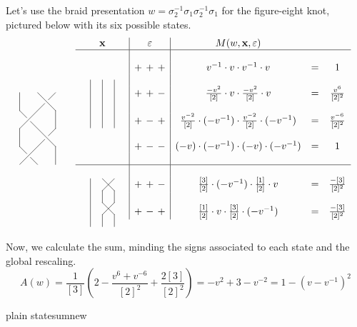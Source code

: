 \documentclass [12pt, letterpaper, oneside] {amsart}
\newcommand \e {\varepsilon}
\newcommand \s {\sigma}
\newcommand \mb {\mathbf}
\theoremstyle {plain}
\begin{document}
Let's use the braid presentation $w = \s_2^{-1} \s_1 \s_2^{-1} \s_1$ for the figure-eight knot, pictured below with its six possible states.
\[
\vcenter{\xy 0;/r.15pc/:
(0,0);(14,14)**@{-},
(16,16);(20,20)**@{-},
(20,20);(20,30)**@{-},
(20,30);(10,40)**@{-},
(10,0);(6,4)**@{-},
(4,6);(0,10)**@{-},
(0,10);(0,20)**@{-},
(0,20);(14,34)**@{-},
(16,36);(20,40)**@{-},
(20,0);(20,10)**@{-},
(20,10);(6,24)**@{-},
(4,26);(0,30)**@{-},
(0,30);(0,40)**@{-}
\endxy} \qquad
\begin {array} {c | c | c c c}
\mb{x} & \e & M(w, \mb{x}, \e) & & \\
\hline
& & & & \\
\multirow {7} {*}
{\quad $\vcenter{\xy 0;/r.10pc/:
(0,0);(0,40)**@{-},
(10,0);(10,40)**@{-},
(20,0);(20,40)**@{-}
\endxy}$} \quad
& + \, + \, + & v^{-1} \cdot v \cdot v^{-1} \cdot v &=& 1 \\
&&&& \\
&+ \, + \, - & \frac {-v^2} {[2]} \cdot v \cdot \frac {-v^2} {[2]} \cdot v &=& \frac {v^6} {[2]^2} \\
&&&& \\
&+ \, - \, + & \frac {v^{-2}} {[2]} \cdot (-v^{-1}) \cdot \frac {v^{-2}} {[2]} \cdot (-v^{-1}) &=& \frac {v^{-6}} {[2]^2} \\
&&&& \\
&+ \, - \, - & (-v) \cdot (-v^{-1}) \cdot (-v) \cdot (-v^{-1}) &=& 1 \\
&&&& \\
\hline
& & & & \\
\multirow {3} {*}
{\quad $\vcenter{\xy 0;/r.10pc/:
(0,0);(0,40)**@{-},
(10,0);(10,10)**@{-},
(10,10);(20,20)**@{-},
(20,20);(20,30)**@{-},
(20,30);(10,40)**@{-},
(20,0);(20,10)**@{-},
(20,10);(10,20)**@{-},
(10,20);(10,30)**@{-},
(10,30);(20,40)**@{-}
\endxy}$} \quad
&+ \, + \, - & \frac {[3]} {[2]} \cdot (-v^{-1}) \cdot \frac {[1]} {[2]} \cdot v &=& \frac {-[3]} {[2]^2} \\
&&&& \\
&+ \, - \, + & \frac {[1]} {[2]} \cdot v \cdot \frac {[3]} {[2]} \cdot (-v^{-1}) &=& \frac {-[3]} {[2]^2}
\end {array}
\] \\

Now, we calculate the sum, minding the signs associated to each state and the global rescaling.
\begin {equation*}
A(w) = \dfrac {1} {[3]} \left( 2 - \dfrac {v^6 + v^{-6}} {[2]^2} + \dfrac {2 [3]} {[2]^2} \right) = -v^2+3-v^{-2} = 1 - (v-v^{-1})^2
\end {equation*}

 {plain}
 {statesumnew}
\end{document}
